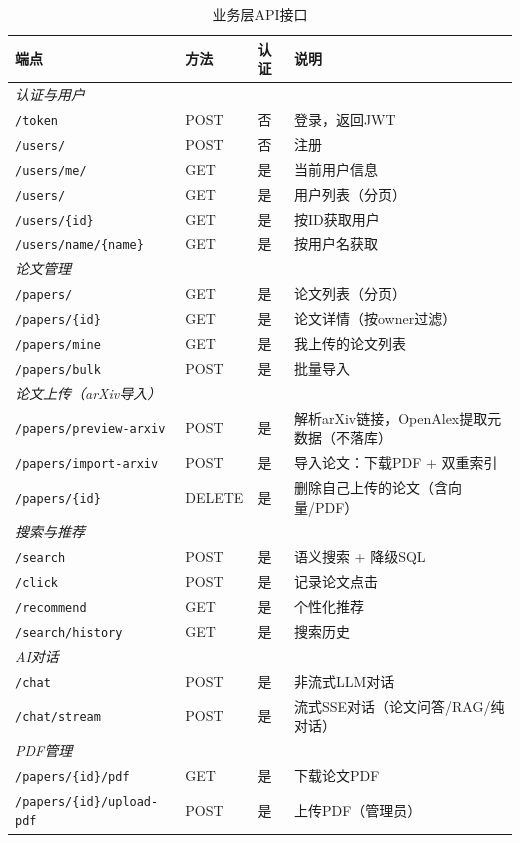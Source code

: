 \documentclass[12pt,a4paper]{ctexart}
\newcommand{\code}[1]{\texttt{#1}}
\begin{document}
\begin{table}[H]
\centering
\caption{业务层API接口}
\label{tab:api}
\small
\begin{tabular}{lllp{5.5cm}}
\toprule
\textbf{端点} & \textbf{方法} & \textbf{认证} & \textbf{说明} \\
\midrule
\multicolumn{4}{l}{\textit{认证与用户}} \\
\code{/token}                & POST & 否 & 登录，返回JWT \\
\code{/users/}               & POST & 否 & 注册 \\
\code{/users/me/}            & GET  & 是 & 当前用户信息 \\
\code{/users/}               & GET  & 是 & 用户列表（分页）\\
\code{/users/\{id\}}         & GET  & 是 & 按ID获取用户 \\
\code{/users/name/\{name\}}  & GET  & 是 & 按用户名获取 \\
\midrule
\multicolumn{4}{l}{\textit{论文管理}} \\
\code{/papers/}              & GET  & 是 & 论文列表（分页）\\
\code{/papers/\{id\}}        & GET  & 是 & 论文详情（按owner过滤）\\
\code{/papers/mine}          & GET  & 是 & 我上传的论文列表 \\
\code{/papers/bulk}          & POST & 是 & 批量导入 \\
\midrule
\multicolumn{4}{l}{\textit{论文上传（arXiv导入）}} \\
\code{/papers/preview-arxiv} & POST & 是 & 解析arXiv链接，OpenAlex提取元数据（不落库）\\
\code{/papers/import-arxiv}  & POST & 是 & 导入论文：下载PDF + 双重索引 \\
\code{/papers/\{id\}}        & DELETE & 是 & 删除自己上传的论文（含向量/PDF）\\
\midrule
\multicolumn{4}{l}{\textit{搜索与推荐}} \\
\code{/search}               & POST & 是 & 语义搜索 + 降级SQL \\
\code{/click}                & POST & 是 & 记录论文点击 \\
\code{/recommend}            & GET  & 是 & 个性化推荐 \\
\code{/search/history}       & GET  & 是 & 搜索历史 \\
\midrule
\multicolumn{4}{l}{\textit{AI对话}} \\
\code{/chat}                 & POST & 是 & 非流式LLM对话 \\
\code{/chat/stream}          & POST & 是 & 流式SSE对话（论文问答/RAG/纯对话）\\
\midrule
\multicolumn{4}{l}{\textit{PDF管理}} \\
\code{/papers/\{id\}/pdf}       & GET  & 是 & 下载论文PDF \\
\code{/papers/\{id\}/upload-pdf}& POST & 是 & 上传PDF（管理员）\\
\bottomrule
\end{tabular}
\end{table}
\end{document}
